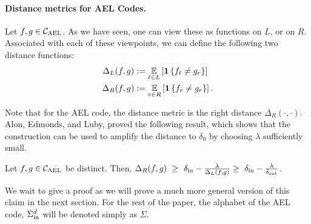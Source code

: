 \paragraph{Distance metrics for AEL Codes.}
Let $f,g \in { {\mathcal C}_{\mathrm{AEL}} }$. As we have seen, one can view these as functions on $L$, or on $R$. Associated with each of these viewpoints, we can define the following two distance functions:
\begin{align*}
	\dis_L(f,g) &\defeq \Ex{\li\in L}{ \indi{ f_{\ell} \neq g_{\ri}}} \\
	\dis_R(f,g) &\defeq \Ex{\ri\in R}{ \indi{ f_{\ri} \neq g_{\ri}}} .
\end{align*}

Note that for the AEL code, the distance metric is the right distance $\Delta_R(\cdot, \cdot)$. Alon, Edmonds, and Luby, proved the following result, which shows that the construction can be used to amplify the distance to $\delta_0$ by choosing $\lambda$ sufficiently small.
%
\begin{theorem}\label{thm:ael_distance}
	Let $f,g \in { {\mathcal C}_{\mathrm{AEL}} }$ be distinct. Then, ${\Delta}_R(f,g)~\geq~ \delta_{\mathrm{in}}-
        \frac{\lambda}{{\Delta}_L(f,g)} \geq~ \delta_{\mathrm{in}} - \frac{\lambda}{\delta_{\mathrm{out}}} $.
\end{theorem}
We wait to give a proof as we will prove a much more general version of this claim in the next section. For the rest of the paper, the alphabet of the AEL code, $\Sigma_{\mathrm{in}}^d$ will be denoted simply as $\Sigma$.



